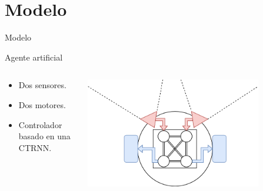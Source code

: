 \documentclass[aspectratio=169]{beamer}
\begin{document}
\section{Modelo}
\begin{frame}{Modelo}
\begin{block}{Agente artificial}
  \begin{columns}
    \begin{column}{0.47\textwidth}
        \begin{itemize}
            \item Dos sensores.
            \item Dos motores.
            \item Controlador basado en una CTRNN.
        \end{itemize}
    \end{column}
    \begin{column}{0.5\textwidth}
        \includegraphics[width=0.8\textwidth,height=.35\textheight]{Imagenes/AgentSchema}
    \end{column}
\end{columns}
\end{block}
\end{frame}
\end{document}

